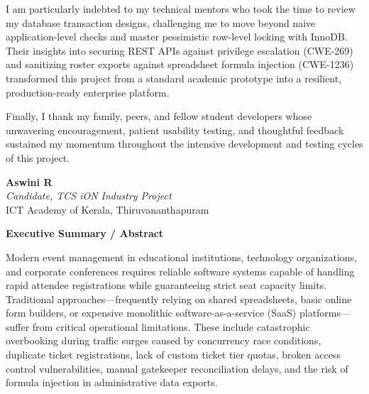 \documentclass[11pt,a4paper]{report}
\begin{document}
\vspace{0.18in}
\noindent
I am particularly indebted to my technical mentors who took the time to review my database transaction designs, challenging me to move beyond naive application-level checks and master pessimistic row-level locking with InnoDB. Their insights into securing REST APIs against privilege escalation (CWE-269) and sanitizing roster exports against spreadsheet formula injection (CWE-1236) transformed this project from a standard academic prototype into a resilient, production-ready enterprise platform.

\vspace{0.18in}
\noindent
Finally, I thank my family, peers, and fellow student developers whose unwavering encouragement, patient usability testing, and thoughtful feedback sustained my momentum throughout the intensive development and testing cycles of this project.

\vspace{0.5in}
\begin{flushright}
  \textbf{Aswini R}\\
  \textit{Candidate, TCS iON Industry Project}\\
  ICT Academy of Kerala, Thiruvananthapuram
\end{flushright}

\newpage
\thispagestyle{plain}

\vspace*{0.3in}

\begin{center}
  {\color{TitleBlue}\bfseries\fontsize{18}{22}\selectfont Executive Summary / Abstract\par}
\end{center}

\vspace{0.25in}

\justifying
\noindent
Modern event management in educational institutions, technology organizations, and corporate conferences requires reliable software systems capable of handling rapid attendee registrations while guaranteeing strict seat capacity limits. Traditional approaches---frequently relying on shared spreadsheets, basic online form builders, or expensive monolithic software-as-a-service (SaaS) platforms---suffer from critical operational limitations. These include catastrophic overbooking during traffic surges caused by concurrency race conditions, duplicate ticket registrations, lack of custom ticket tier quotas, broken access control vulnerabilities, manual gatekeeper reconciliation delays, and the risk of formula injection in administrative data exports.
\end{document}
